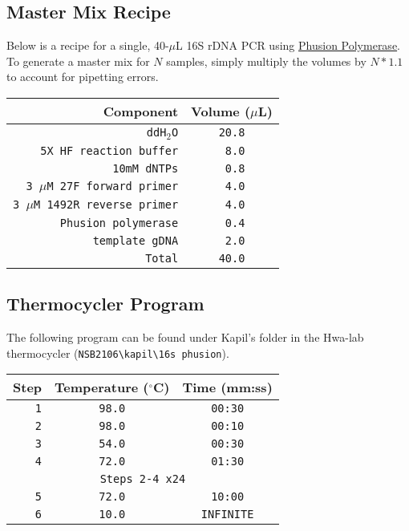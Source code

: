 \documentclass[twocolumn]{article}
\begin{document}
\subsection{Master Mix Recipe}
Below is a recipe for a single,
40-$\mu$L 16S rDNA PCR using \href{https://www.neb.com/protocols/0001/01/01/pcr-protocol-m0530}{Phusion Polymerase}.
To generate a master mix for $N$ samples,
simply multiply the volumes by $N*1.1$ to account for pipetting errors.
\begin{table}[h]
  \begin{tabular}{|r|c|}
    \hline
    \textbf{Component} & \textbf{Volume ($\mu$L)} \\
    \hline
    \texttt{ddH$_2$O} & \texttt{20.8} \\
    \hline
    \texttt{5X HF reaction buffer} & \texttt{ 8.0} \\
    \hline
    \texttt{10mM dNTPs} & \texttt{ 0.8}\\
    \hline
    \texttt{3 $\mu$M 27F forward primer} & \texttt{ 4.0} \\
    \hline
    \texttt{3 $\mu$M 1492R reverse primer} & \texttt{ 4.0} \\
    \hline
    \texttt{Phusion polymerase} & \texttt{ 0.4} \\
    \hline
    \texttt{template gDNA} & \texttt{ 2.0} \\
    \hline
    \texttt{Total} & \texttt{40.0} \\
    \hline
  \end{tabular}
  \label{tab:PCR_MM}
\end{table}

\subsection{Thermocycler Program}
The following program can be found under Kapil's folder in the Hwa-lab thermocycler
(\texttt{NSB2106\textbackslash kapil\textbackslash 16s phusion}).
\begin{table}[h]
  \begin{tabular}{|r|c|c|}
    \hline
    \textbf{Step} & \textbf{Temperature ($^\circ$C)} & \textbf{Time (mm:ss)}\\
    \hline
    \texttt{1} & \texttt{98.0} & \texttt{00:30}\\
    \hline
    \texttt{2} & \texttt{98.0} & \texttt{00:10}\\
    \hline
    \texttt{3} & \texttt{54.0} & \texttt{00:30}\\
    \hline
    \texttt{4} & \texttt{72.0} & \texttt{01:30}\\
    \hline
    \multicolumn{3}{|c|}{\texttt{Steps 2-4 x24}}\\
    \hline
    \texttt{5} & \texttt{72.0} & \texttt{10:00}\\
    \hline
    \texttt{6} & \texttt{10.0} & \texttt{INFINITE}\\
    \hline
  \end{tabular}
  \label{tab:PCR_prog}
\end{table}
\end{document}
